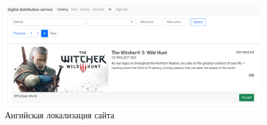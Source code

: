 \begin{figure}[!htb]
	\centering
	  \includegraphics[scale=0.4]{attachments/en.png}  
	  \caption{ Ангийская локализация сайта }
	  \label{sec:testing:func:en}
\end{figure}

